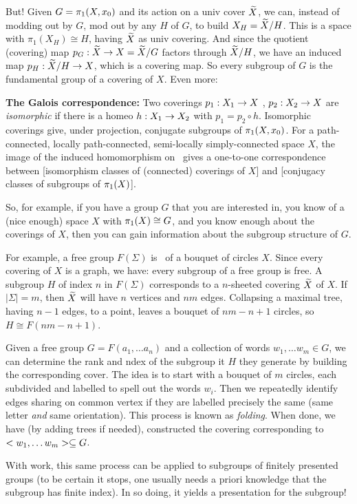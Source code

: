 \documentclass[12pt]{article}
\begin{document}
But! Given $G=\pi_1(X,x_0)$ and its 
action on a univ cover $\widetilde{X}$, we can, instead of modding out by $G$,
mod out by any  $H$ of $G$, to build $X_H=\widetilde{X}/H$. 
This is a space with $\pi_1(X_H)\cong H$, having $\widetilde{X}$ as univ covering.
And since the quotient (covering) map $p_G:\widetilde{X}\rightarrow X=\widetilde{X}/G$ factors through $\widetilde{X}/H$,
we have an induced map $p_H:\widetilde{X}/H\rightarrow X$, which is a covering map.
So every subgroup of $G$ is the
fundamental group of a covering of $X$. Even more:

{\bf The Galois correspondence:} 
Two coverings
$p_1:X_1\rightarrow X$ , $p_2:X_2\rightarrow X$ are {\it isomorphic} if there is a homeo
$h:X_1\rightarrow X_2$ with $p_1=p_2\circ h$. Isomorphic coverings give,
under projection, conjugate subgroups of $\pi_1(X,x_0)$.
For a path-connected, locally path-connected, semi-locally simply-connected space $X$,  
the image of the induced homomorphism on \mpu\ 
gives a one-to-one correspondence between 
[isomorphism classes of (connected) coverings of $X$] and 
[conjugacy classes of subgroups of $\pi_1(X)$].

\ssk

So, for example, if you have a group $G$ that you are interested in, you know of a (nice enough) 
space $X$ with $\pi_1(X)\cong G$, and you know enough about the coverings of $X$, then you can
gain information about the subgroup structure of $G$. 

For example, a free group $F(\Sigma)$ is \mpu\ of a bouquet of circles $X$. Since every covering
of $X$ is a graph, we have: every
subgroup of a free group is free. 
A subgroup $H$ of index $n$ in $F(\Sigma)$ corresponds to a $n$-sheeted covering $\widetilde{X}$ of $X$. If
$|\Sigma| = m$, then $\widetilde{X}$ will have $n$ vertices and $nm$ edges. Collapsing a maximal
tree, having $n-1$ edges, to a point, leaves a bouquet of $nm-n+1$ circles, so $H\cong F(nm-n+1)$.

Given a free group
$G=F(a_1,\ldots a_n)$ and a collection of words $w_1,\ldots w_m\in G$,
we can determine the rank and ndex of the subgroup it $H$ they
generate by building the corresponding cover. The idea is
to start with a bouquet of $m$ circles, each subdivided 
and labelled to spell
out the words $w_i$. Then we repeatedly identify edges sharing
on common vertex if they are labelled precisely the same (same
letter {\it and} same orientation). This process is known
as {\it folding}. When done, we have (by adding trees if needed),
constructed the covering corresponding to $<w_1,\ldots w_m>\subseteq G$.

With work, this same process can be applied to subgroups of finitely presented
groups (to be certain it stops, one usually needs a priori knowledge that the 
subgroup has finite index). In so doing, it yields a presentation for the subgroup!
\end{document}
